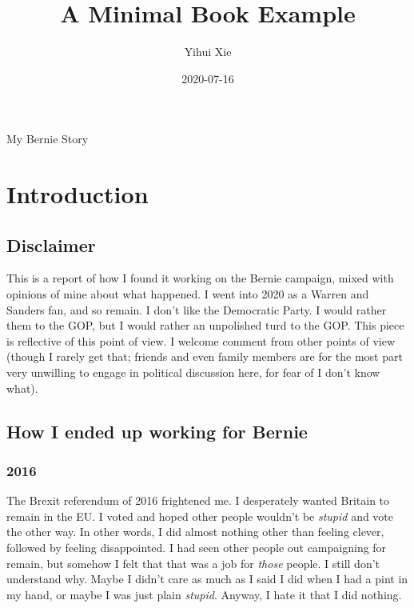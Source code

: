 \documentclass[]{book}
\title{A Minimal Book Example}
\author{Yihui Xie}
\date{2020-07-16}
\begin{document}
\maketitle

{
\setcounter{tocdepth}{1}
\tableofcontents
}
My Bernie Story

\hypertarget{intro}{%
\chapter{Introduction}\label{intro}}

\hypertarget{disclaimer}{%
\section{Disclaimer}\label{disclaimer}}

This is a report of how I found it working on the Bernie campaign, mixed with opinions of mine about what happened. I went into 2020 as a Warren and Sanders fan, and so remain. I don't like the Democratic Party. I would rather them to the GOP, but I would rather an unpolished turd to the GOP. This piece is reflective of this point of view. I welcome comment from other points of view (though I rarely get that; friends and even family members are for the most part very unwilling to engage in political discussion here, for fear of I don't know what).

\hypertarget{how-i-ended-up-working-for-bernie}{%
\section{How I ended up working for Bernie}\label{how-i-ended-up-working-for-bernie}}

\hypertarget{section}{%
\subsection{2016}\label{section}}

The Brexit referendum of 2016 frightened me. I desperately wanted Britain to remain in the EU. I voted and hoped other people wouldn't be \emph{stupid} and vote the other way. In other words, I did almost nothing other than feeling clever, followed by feeling disappointed. I had seen other people out campaigning for remain, but somehow I felt that that was a job for \emph{those} people. I still don't understand why. Maybe I didn't care as much as I said I did when I had a pint in my hand, or maybe I was just plain \emph{stupid}. Anyway, I hate it that I did nothing.
\end{document}
